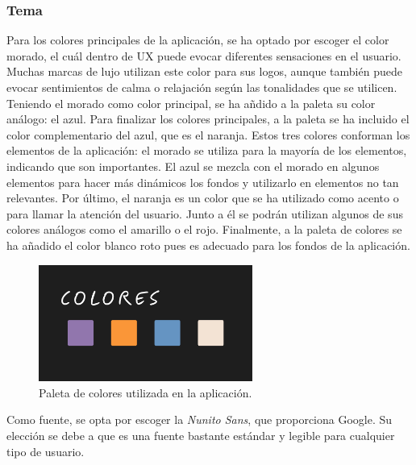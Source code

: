 \documentclass[a4paper, 12pt]{article}
\begin{document}
\subsubsection{Tema}

Para los colores principales de la aplicación, se ha optado por escoger el color morado, el cuál dentro de UX puede evocar diferentes sensaciones en el usuario. Muchas marcas de lujo utilizan este color para sus logos, aunque también puede evocar sentimientos de calma o relajación según las tonalidades que se utilicen. Teniendo el morado como color principal, se ha añdido a la paleta su color análogo: el azul. Para finalizar los colores principales, a la paleta se ha incluido el color complementario del azul, que es el naranja. Estos tres colores conforman los elementos de la aplicación: el morado se utiliza para la mayoría de los elementos, indicando que son importantes. El azul se mezcla con el morado en algunos elementos para hacer más dinámicos los fondos y utilizarlo en elementos no tan relevantes. Por último, el naranja es un color que se ha utilizado como acento o para llamar la atención del usuario. Junto a él se podrán utilizan algunos de sus colores análogos como el amarillo o el rojo. Finalmente, a la paleta de colores se ha añadido el color blanco roto pues es adecuado para los fondos de la aplicación.

\begin{figure}[H]
	\begin{center}
		{\includegraphics[width=7cm]{design/Colors.jpg}\par}
		\caption{Paleta de colores utilizada en la aplicación.}
	\end{center}
\end{figure}

Como fuente, se opta por escoger la \textit{Nunito Sans}, que proporciona Google. Su elección se debe a que es una fuente bastante estándar y legible para cualquier tipo de usuario.
\end{document}

